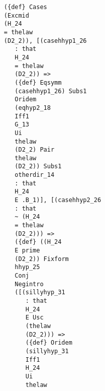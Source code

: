 \documentclass[12pt]{article}
\begin{document}
\begin{verbatim}
                                           ({def} Cases 
                                           (Excmid 
                                           (H_24 
                                           = thelaw 
                                           (D2_2)), [(casehhyp1_26 
                                              : that 
                                              H_24 
                                              = thelaw 
                                              (D2_2)) => 
                                              ({def} Eqsymm 
                                              (casehhyp1_26) Subs1 
                                              Oridem 
                                              (eqhyp2_18 
                                              Iff1 
                                              G_13 
                                              Ui 
                                              thelaw 
                                              (D2_2) Pair 
                                              thelaw 
                                              (D2_2)) Subs1 
                                              otherdir_14 
                                              : that 
                                              H_24 
                                              E .B_1)], [(casehhyp2_26 
                                              : that 
                                              ~ (H_24 
                                              = thelaw 
                                              (D2_2))) => 
                                              ({def} ((H_24 
                                              E prime 
                                              (D2_2)) Fixform 
                                              hhyp_25 
                                              Conj 
                                              Negintro 
                                              ([(sillyhyp_31 
                                                 : that 
                                                 H_24 
                                                 E Usc 
                                                 (thelaw 
                                                 (D2_2))) => 
                                                 ({def} Oridem 
                                                 (sillyhyp_31 
                                                 Iff1 
                                                 H_24 
                                                 Ui 
                                                 thelaw 

\end{verbatim}
\end{document}
